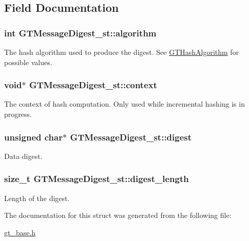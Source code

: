 \subsection{Field Documentation}
\hypertarget{struct_g_t_message_digest__st_a4562fac49b3cfdec37198dfa656158a5}{
\subsubsection[{algorithm}]{\setlength{\rightskip}{0pt plus 5cm}int {\bf GTMessageDigest\_\-st::algorithm}}}
\label{struct_g_t_message_digest__st_a4562fac49b3cfdec37198dfa656158a5}
The hash algorithm used to produce the digest. See \hyperlink{group__common_ga5110e02245c37b4ff48ea4c4efb2924a}{GTHashAlgorithm} for possible values. \hypertarget{struct_g_t_message_digest__st_a1e0f499b53b27ef920b1bac9a1a83b3f}{
\subsubsection[{context}]{\setlength{\rightskip}{0pt plus 5cm}void$\ast$ {\bf GTMessageDigest\_\-st::context}}}
\label{struct_g_t_message_digest__st_a1e0f499b53b27ef920b1bac9a1a83b3f}
The context of hash computation. Only used while incremental hashing is in progress. \hypertarget{struct_g_t_message_digest__st_a53a1fc3f2fdabc9de5b9b6655029513a}{
\subsubsection[{digest}]{\setlength{\rightskip}{0pt plus 5cm}unsigned char$\ast$ {\bf GTMessageDigest\_\-st::digest}}}
\label{struct_g_t_message_digest__st_a53a1fc3f2fdabc9de5b9b6655029513a}
Data digest. \hypertarget{struct_g_t_message_digest__st_a82b4f7bd46c9de400747db1ad357ec80}{
\subsubsection[{digest\_\-length}]{\setlength{\rightskip}{0pt plus 5cm}size\_\-t {\bf GTMessageDigest\_\-st::digest\_\-length}}}
\label{struct_g_t_message_digest__st_a82b4f7bd46c9de400747db1ad357ec80}
Length of the digest. 

The documentation for this struct was generated from the following file:\begin{DoxyCompactItemize}
\item 
\hyperlink{gt__base_8h}{gt\_\-base.h}\end{DoxyCompactItemize}
